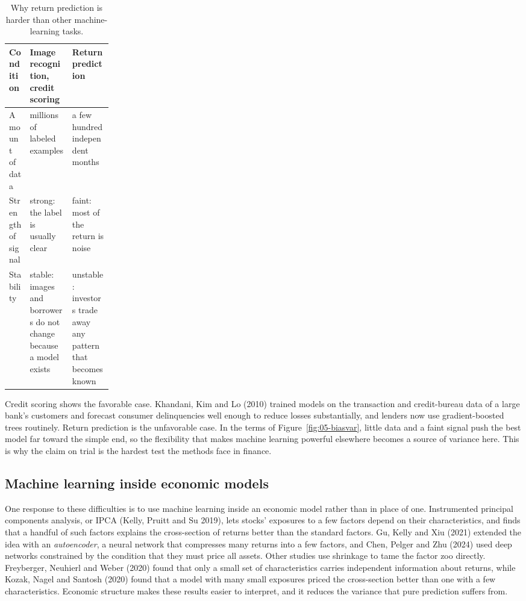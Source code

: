 \begin{table}[htbp]
\centering
\small
\caption{Why return prediction is harder than other machine-learning tasks.}
\label{tab:21-conditions}
\begin{tabularx}{0.9\linewidth}{@{}>{\raggedright\arraybackslash}p{0.2\linewidth}>{\raggedright\arraybackslash}X>{\raggedright\arraybackslash}X@{}}
\toprule
Condition & Image recognition, credit scoring & Return prediction \\
\midrule
Amount of data & millions of labeled examples & a few hundred independent months \\
Strength of signal & strong: the label is usually clear & faint: most of the return is noise \\
Stability & stable: images and borrowers do not change because a model exists & unstable: investors trade away any pattern that becomes known \\
\bottomrule
\end{tabularx}
\end{table}

Credit scoring shows the favorable case. Khandani, Kim and Lo (2010) trained models on the transaction and credit-bureau data of a large bank's customers and forecast consumer delinquencies well enough to reduce losses substantially, and lenders now use gradient-boosted trees routinely. Return prediction is the unfavorable case. In the terms of Figure~\ref{fig:05-biasvar}, little data and a faint signal push the best model far toward the simple end, so the flexibility that makes machine learning powerful elsewhere becomes a source of variance here. This is why the claim on trial is the hardest test the methods face in finance.

\subsection{Machine learning inside economic models}

One response to these difficulties is to use machine learning inside an economic model rather than in place of one. Instrumented principal components analysis, or IPCA (Kelly, Pruitt and Su 2019), lets stocks' exposures to a few factors depend on their characteristics, and finds that a handful of such factors explains the cross-section of returns better than the standard factors. Gu, Kelly and Xiu (2021) extended the idea with an \emph{autoencoder}, a neural network that compresses many returns into a few factors, and Chen, Pelger and Zhu (2024) used deep networks constrained by the condition that they must price all assets. Other studies use shrinkage to tame the factor zoo directly. Freyberger, Neuhierl and Weber (2020) found that only a small set of characteristics carries independent information about returns, while Kozak, Nagel and Santosh (2020) found that a model with many small exposures priced the cross-section better than one with a few characteristics. Economic structure makes these results easier to interpret, and it reduces the variance that pure prediction suffers from.



